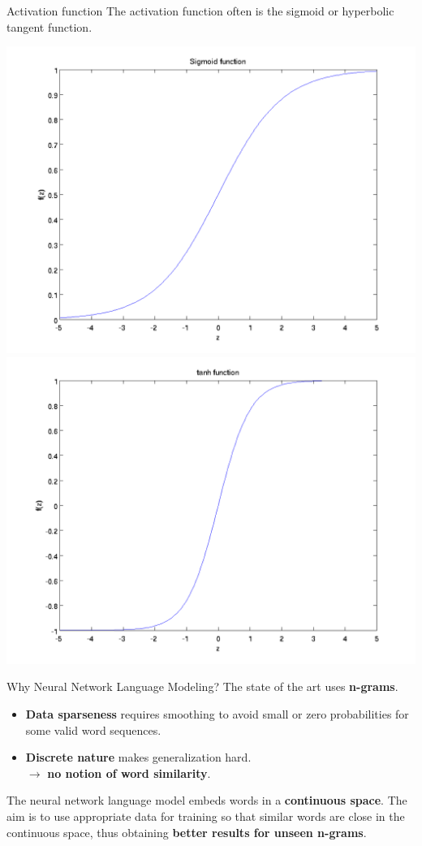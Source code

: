 \documentclass{beamer}
\begin{document}
\begin{frame}{Activation function}
	The activation function often is the sigmoid or hyperbolic tangent function.
	\begin{center}
		\includegraphics[scale=0.28]{images/sigmoid.png}
		\includegraphics[scale=0.28]{images/tanh.png}
	\end{center}
\end{frame}

\begin{frame}{Why Neural Network Language Modeling?}
	The state of the art uses \textbf{n-grams}.
	\begin{itemize}
		\item \textbf{Data sparseness} requires smoothing to avoid small or zero probabilities for some valid word sequences.
		\item \textbf{Discrete nature} makes generalization hard. \\ $\rightarrow$ \textbf{no notion of word similarity}.
	\end{itemize}
	\vspace{5mm}
	The neural network language model embeds words in a\textbf{ continuous space}. The aim is to use appropriate data for training so that similar words are close in the continuous space, thus obtaining \textbf{better results for unseen n-grams}.
\end{frame}
\end{document}
